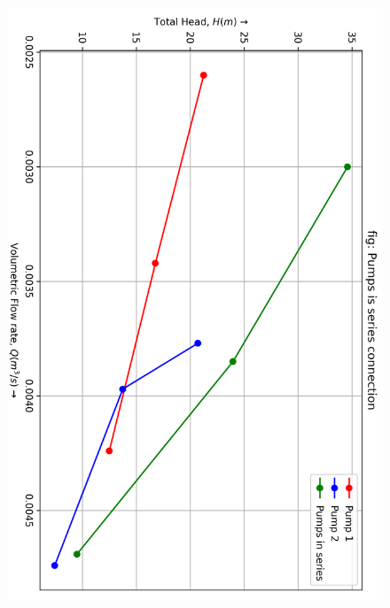 \documentclass[12pt]{article}
\begin{document}
\begin{figure}[h]
  \begin{center}
    \includegraphics[width=0.85\linewidth]{img/series_graph.png}
  \end{center}
\end{figure}
\end{document}
